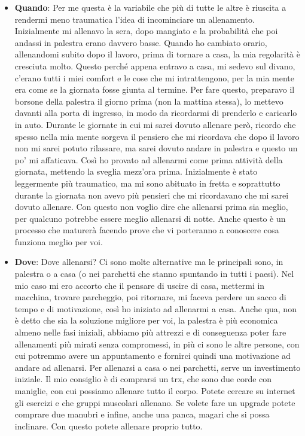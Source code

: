 \documentclass[12pt]{book} %
\begin{document}
\begin{itemize}
\item \textbf{Quando}: Per me questa è la variabile che più di tutte le altre è riuscita a rendermi meno traumatica l'idea di incominciare un allenamento. Inizialmente mi allenavo la sera, dopo mangiato e la probabilità che poi andassi in palestra erano davvero basse. Quando ho cambiato orario, allenandomi subito dopo il lavoro, prima di tornare a casa, la mia regolarità è cresciuta molto. Questo perché appena entravo a casa, mi sedevo sul divano, c'erano tutti i miei comfort e le cose che mi intrattengono, per la mia mente era come se la giornata fosse giunta al termine.
Per fare questo, preparavo il borsone della palestra il giorno prima (non la mattina stessa), lo mettevo davanti alla porta di ingresso, in modo da ricordarmi di prenderlo e caricarlo in auto. 
Durante le giornate in cui mi sarei dovuto allenare però, ricordo che spesso nella mia mente sorgeva il pensiero che mi ricordava che dopo il lavoro non mi sarei potuto rilassare, ma sarei dovuto andare in palestra e questo un po' mi affaticava. Così ho provato ad allenarmi come prima attività della giornata, mettendo la sveglia mezz'ora prima. Inizialmente è stato leggermente più traumatico, ma mi sono abituato in fretta e soprattutto durante la giornata non avevo più pensieri che mi ricordavano che mi sarei dovuto allenare. Con questo non voglio dire che allenarsi prima sia meglio, per qualcuno potrebbe essere meglio allenarsi di notte. Anche questo è un processo che maturerà facendo prove che vi porteranno a conoscere cosa funziona meglio per voi. 

\item \textbf{Dove}: Dove allenarsi? Ci sono molte alternative ma le principali sono, in palestra o a casa (o nei parchetti che stanno spuntando in tutti i paesi). Nel mio caso mi ero accorto che il pensare di uscire di casa, mettermi in macchina, trovare parcheggio, poi ritornare, mi faceva perdere un sacco di tempo e di motivazione, così ho iniziato ad allenarmi a casa. Anche qua, non è detto che sia la soluzione migliore per voi, la palestra è più economica almeno nelle fasi iniziali, abbiamo più attrezzi e di conseguenza poter fare allenamenti più mirati senza compromessi, in più ci sono le altre persone, con cui potremmo avere un appuntamento e fornirci quindi una motivazione ad andare ad allenarsi.
Per allenarsi a casa o nei parchetti, serve un investimento iniziale. Il mio consiglio è di comprarsi un trx, che sono due corde con maniglie, con cui possiamo allenare tutto il corpo. Potete cercare su internet gli esercizi e che gruppi muscolari allenano. Se volete fare un upgrade potete comprare due manubri e infine, anche una panca, magari che si possa inclinare. Con questo potete allenare proprio tutto.


\end{itemize}
\end{document}
